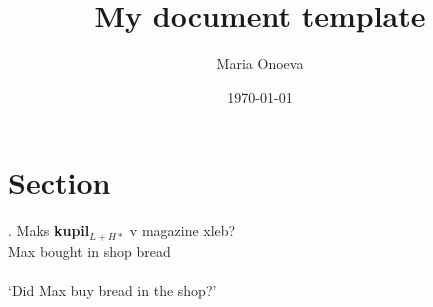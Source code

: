 

    
\title{My \Latex document template}
\date{\today}
\author{Maria Onoeva}

\maketitle


\section{Section}\label{sec:section}
\cite{Abels2005}

\exg.
Maks \textcolor{WildStrawberry}{\textbf{kupil}}$_{L+H*}$ v magazine xleb? \\
Max bought in shop bread \\\\
`Did Max buy bread in the shop?' 
\label{ex:inton1}
\par








